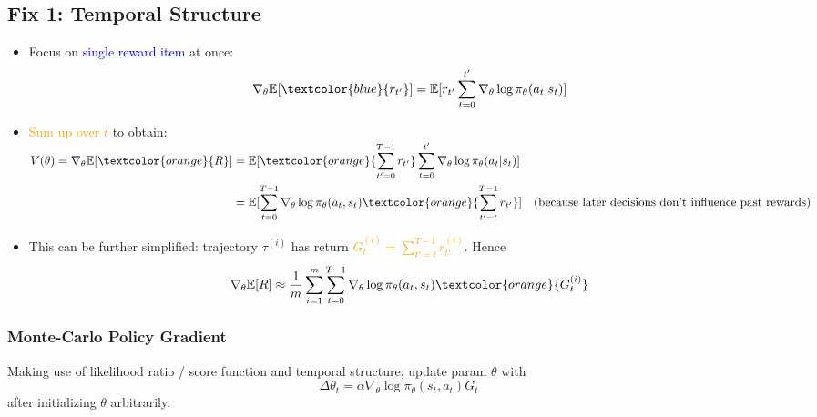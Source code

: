 \documentclass{article}
\begin{document}
\subsection{Fix 1: Temporal Structure}
\begin{itemize}
\item Focus on \textcolor{blue}{single reward item} at once:
    \begin{equation*}
        \nabla_{\theta} \mathbb{E}[\textcolor{blue}{r_{t'}}] = \mathbb{E}[r_{t'} \sum_{t = 0}^{t'} \nabla_{\theta} \log \pi_{\theta} (a_t | s_t)]
    \end{equation*}
\item \textcolor{orange}{Sum up over $t$} to obtain:
    $\begin{aligned}
        V(\theta) = \nabla_{\theta} \mathbb{E}[\textcolor{orange}{R}] & 
        = \mathbb{E} [ \textcolor{orange}{\sum_{t' = 0}^{T-1} r_{t'}} \sum_{t = 0}^{t'} \nabla_{\theta} \log \pi_{\theta} (a_t | s_t)] \\
        & = \mathbb{E} [ \sum_{t = 0}^{T-1} \nabla_{\theta} \log \pi_{\theta} (a_t , s_t) \textcolor{orange}{\sum_{t' = t}^{T-1} r_{t'}}] \quad \text{(because later decisions don't influence past rewards)}\\
    \end{aligned}$
\item This can be further simplified: trajectory $\tau^{(i)}$ has return \textcolor{orange}{$G_t^{(i)} = \sum_{t' = t}^{T-1} r_{t'}^{(i)}$}. Hence
    \begin{equation*}
        \nabla_{\theta} \mathbb{E}[R] \approx \frac{1}{m} \sum_{i = 1}^{m} \sum_{t = 0}^{T-1} \nabla_{\theta} \log \pi_{\theta} (a_t, s_t) \textcolor{orange}{G_t^{(i)}}
    \end{equation*}
\end{itemize}

\begin{thmbox}
    \subsubsection*{Monte-Carlo Policy Gradient}
    Making use of likelihood ratio / score function and temporal structure, update param $\theta$ with
    \begin{equation*}
        \Delta \theta_{t} = \alpha \nabla_{\theta} \log \pi_{\theta} (s_t, a_t) G_{t}
    \end{equation*}
    after initializing $\theta$ arbitrarily.
\end{thmbox}
\end{document}
